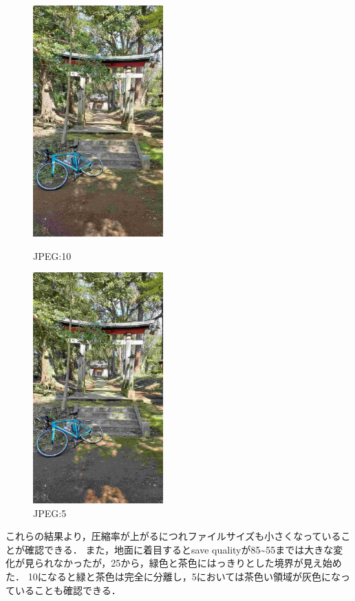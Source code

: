 \documentclass[a4paper,11pt]{bxjsarticle}
\begin{document}
  \begin{figure}[htbp]
    \begin{minipage}{0.5\hsize}
     \begin{center}
      \includegraphics[width=50mm]{sample_j10.jpg}
     \end{center}
     \caption{JPEG:10}
     \label{fig:j10}
    \end{minipage}
    \begin{minipage}{0.5\hsize}
     \begin{center}
      \includegraphics[width=50mm]{sample_j5.jpg}
     \end{center}
     \caption{JPEG:5}
     \label{fig:j5}
    \end{minipage}
   \end{figure}
\newpage

これらの結果より，圧縮率が上がるにつれファイルサイズも小さくなっていることが確認できる．
また，地面に着目するとsave qualityが85\textasciitilde55までは大きな変化が見られなかったが，25から，緑色と茶色にはっきりとした境界が見え始めた．
10になると緑と茶色は完全に分離し，5においては茶色い領域が灰色になっていることも確認できる．
\end{document}
